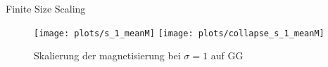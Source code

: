 \documentclass{beamer}
\begin{document}
        \begin{frame}{Finite Size Scaling}
            \begin{figure}[htbp]
                \centering
                \subfigure
                {
                    \label{sfig:gettingCrit:s_1_meanM}
                    \texttt{[image: plots/s\_1\_meanM]}
                }
                \subfigure
                {
                    \label{sfig:gettingCrit:collapse_s_1_meanM}
                    \texttt{[image: plots/collapse\_s\_1\_meanM]}
                }
                \caption
                {
                    Skalierung der magnetisierung bei \(\sigma = 1\) auf GG
                }
                \label{fig:gettingCrit}
            \end{figure}
        \end{frame}
\end{document}
